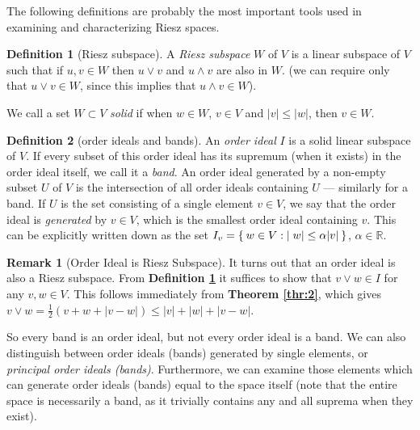 \documentclass[letterpaper,10pt,oneside,onecolumn,reqno]{amsart}
\newcommand{\R}{\mathbb R}
\theoremstyle{definition}
\newtheorem{defn}{Definition}
\newtheorem{rem}{Remark}
\newcommand{\meet}{\wedge}
\newcommand{\join}{\vee}
\begin{document}
The following definitions are probably the most important tools used
in examining and characterizing Riesz spaces.

  \begin{defn}[Riesz subspace]\label{def:7}
    A \emph{Riesz subspace} $W$ of $V$ is a
    linear subspace of $V$ such that if $u,v \in W$ then $u \join v$
    and $u \meet v$ are also in $W$. (we can require only that $u
    \join v \in W$, since this implies that $u \meet v \in W$).
  \end{defn}
  We call a set $W \subset V$ \emph{solid} if when $w \in W$, $v \in
  V$ and $|v| \leq |w|$, then $v \in W$.

  \begin{defn}[order ideals and bands]\label{def:8}
    An \emph{order ideal} $I$ is a solid linear
    subspace of $V$. If every subset of this order ideal has its
    supremum (when it exists) in the order ideal itself, we call it a
    \emph{band}. An order ideal generated by a non-empty
    subset $U$ of $V$ is the intersection of all order ideals
    containing $U$ --- similarly for a band. If $U$ is the set
    consisting of a single element $v \in V$, we say that the order
    ideal is \emph{generated} by $v \in V$, which is the smallest
    order ideal containing $v$. This can be explicitly written down as
    the set $I_{v} = \Set{w \in V: |w| \leq \alpha |v|}$, $\alpha \in
    \R$.
  \end{defn}

  \begin{rem}[Order Ideal is Riesz Subspace]\label{rem:2}
    It turns out that an order ideal is also a Riesz subspace. From
    \textbf{Definition \ref{def:7}} it suffices to show that $v \join
    w \in I$ for any $v,w \in V$. This follows immediately from
    \textbf{Theorem \ref{thr:2}}, which gives $v \join w =
    \frac{1}{2}(v+w+|v-w|) \leq |v| + |w| + |v - w|$.
  \end{rem}

  So every band is an order ideal, but not every order ideal is a
  band. We can also distinguish between order ideals (bands) generated
  by single elements, or \emph{principal order ideals
    (bands)}. Furthermore, we can examine those elements which can
  generate order ideals (bands) equal to the space itself (note that
  the entire space is necessarily a band, as it trivially contains any
  and all suprema when they exist).
\end{document}
